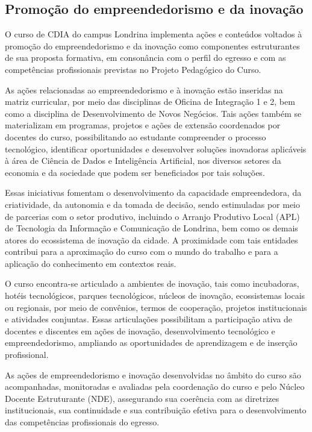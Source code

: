 \subsection{Promoção do empreendedorismo e da inovação}

O curso de CDIA do campus Londrina implementa ações e conteúdos voltados à promoção do empreendedorismo e da inovação como componentes estruturantes de sua proposta formativa, em consonância com o perfil do egresso e com as competências profissionais previstas no Projeto Pedagógico do Curso.

As ações relacionadas ao empreendedorismo e à inovação estão inseridas na matriz curricular, por meio das disciplinas de Oficina de Integração 1 e 2, bem como a disciplina de Desenvolvimento de Novos Negócios. Tais ações também se materializam em programas, projetos e ações de extensão coordenados por docentes do curso, possibilitando ao estudante compreender o processo tecnológico, identificar oportunidades e desenvolver soluções inovadoras aplicáveis à área de Ciência de Dados e Inteligência Artificial, nos diversos setores da economia e da sociedade que podem ser beneficiados por tais soluções.

Essas iniciativas fomentam o desenvolvimento da capacidade empreendedora, da criatividade, da autonomia e da tomada de decisão, sendo estimuladas por meio de parcerias com o setor produtivo, incluindo o Arranjo Produtivo Local (APL) de Tecnologia da Informação e Comunicação de Londrina, bem como os demais atores do ecossistema de inovação da cidade. A proximidade com tais entidades contribui para a aproximação do curso com o mundo do trabalho e para a aplicação do conhecimento em contextos reais.

O curso encontra-se articulado a ambientes de inovação, tais como incubadoras, hotéis tecnológicos, parques tecnológicos, núcleos de inovação, ecossistemas locais ou regionais, por meio de convênios, termos de cooperação, projetos institucionais e atividades conjuntas. Essas articulações possibilitam a participação ativa de docentes e discentes em ações de inovação, desenvolvimento tecnológico e empreendedorismo, ampliando as oportunidades de aprendizagem e de inserção profissional.

As ações de empreendedorismo e inovação desenvolvidas no âmbito do curso são acompanhadas, monitoradas e avaliadas pela coordenação do curso e pelo Núcleo Docente Estruturante (NDE), assegurando sua coerência com as diretrizes institucionais, sua continuidade e sua contribuição efetiva para o desenvolvimento das competências profissionais do egresso.

